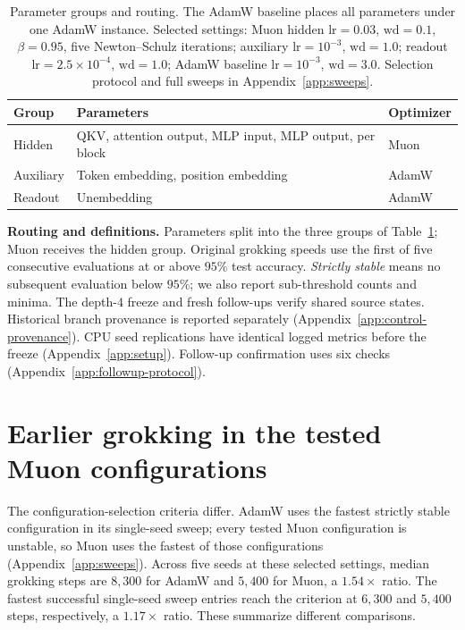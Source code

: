 \documentclass{article}
\begin{document}
\begin{table}[!htbp]
\centering
\small
\caption{Parameter groups and routing. The AdamW baseline places all parameters under one AdamW instance. Selected settings: Muon hidden $\mathrm{lr}=0.03$, $\mathrm{wd}=0.1$, $\beta=0.95$, five Newton--Schulz iterations; auxiliary $\mathrm{lr}=10^{-3}$, $\mathrm{wd}=1.0$; readout $\mathrm{lr}=2.5\times10^{-4}$, $\mathrm{wd}=1.0$; AdamW baseline $\mathrm{lr}=10^{-3}$, $\mathrm{wd}=3.0$. Selection protocol and full sweeps in Appendix~\ref{app:sweeps}.}
\label{tab:routing}
\begin{tabular}{lll}
\toprule
Group & Parameters & Optimizer \\
\midrule
Hidden & QKV, attention output, MLP input, MLP output, per block & Muon \\
Auxiliary & Token embedding, position embedding & AdamW \\
Readout & Unembedding & AdamW \\
\bottomrule
\end{tabular}
\end{table}

\textbf{Routing and definitions.} Parameters split into the three groups of Table~\ref{tab:routing}; Muon receives the hidden group. Original grokking speeds use the first of five consecutive evaluations at or above $95\%$ test accuracy. \emph{Strictly stable} means no subsequent evaluation below $95\%$; we also report sub-threshold counts and minima. The depth-$4$ freeze and fresh follow-ups verify shared source states. Historical branch provenance is reported separately (Appendix~\ref{app:control-provenance}). CPU seed replications have identical logged metrics before the freeze (Appendix~\ref{app:setup}). Follow-up confirmation uses six checks (Appendix~\ref{app:followup-protocol}).

\section{Earlier grokking in the tested Muon configurations}
\label{sec:speed}

The configuration-selection criteria differ. AdamW uses the fastest strictly stable configuration in its single-seed sweep; every tested Muon configuration is unstable, so Muon uses the fastest of those configurations (Appendix~\ref{app:sweeps}). Across five seeds at these selected settings, median grokking steps are $8{,}300$ for AdamW and $5{,}400$ for Muon, a $1.54\times$ ratio. The fastest successful single-seed sweep entries reach the criterion at $6{,}300$ and $5{,}400$ steps, respectively, a $1.17\times$ ratio. These summarize different comparisons.
\end{document}
